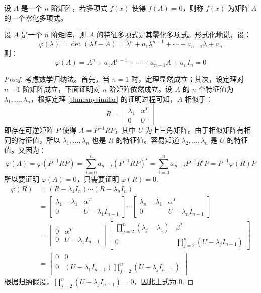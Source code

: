 \begin{definition}[零化多项式]
设 $A$ 是一个 $n$ 阶矩阵，若多项式 $f(x)$ 使得 $f(A)=0$，则称 $f(x)$ 为矩阵 $A$ 的一个零化多项式。
\end{definition}

\begin{theorem}
\label{thm:Hamilton-Cayley}
设 $A$ 是一个 $n$ 阶矩阵，则 $A$ 的特征多项式是其零化多项式。形式化地说，设：
\[
\varphi(\lambda)=\det(\lambda I-A)=\lambda^n+a_1\lambda^{n-1}+\cdots+a_{n-1}\lambda+a_n
\]
则：
\[
\varphi(A)=A^n+a_1A^{n-1}+\cdots+a_{n-1}A+a_nI_n=0
\]
\end{theorem}

\begin{proof}
考虑数学归纳法。首先，当 $n=1$ 时，定理显然成立；其次，设定理对 $n-1$ 阶矩阵成立，下面证明对 $n$ 阶矩阵依然成立。设 $A$ 的 $n$ 个特征值为 $\lambda_1,\ldots,\lambda_n$，根据定理 \ref{thm:anysimilar} 的证明过程可知，$A$ 相似于：
\[R=\begin{bmatrix}\lambda_1&\alpha^T\\0&U\end{bmatrix}\]
即存在可逆矩阵 $P$ 使得 $A=P^{-1}RP$，其中 $U$ 为上三角矩阵。由于相似矩阵有相同的特征值，所以 $\lambda_1,\ldots,\lambda_n$ 也是 $R$ 的特征值。容易知道 $\lambda_2,\ldots,\lambda_n$ 是 $U$ 的特征值。又因为：
\[
\varphi(A)=\varphi(P^{-1}RP)=\sum_{i=0}^n a_{n-i}(P^{-1}RP)^i=\sum_{i=0}^n a_{n-i}P^{-1}R^iP=P^{-1}\varphi(R)P
\]
所以要证明 $\varphi(A)=0$，只需要证明 $\varphi(R)=0$.
\begin{align*}
\varphi(R)&=(R-\lambda_1I_n)\cdots(R-\lambda_n I_n)\\
&=\begin{bmatrix}\lambda_1-\lambda_1&\alpha^T\\0&U-\lambda_1I_{n-1}\end{bmatrix}\cdots\begin{bmatrix}\lambda_n-\lambda_1&\alpha^T\\0&U-\lambda_nI_{n-1}\end{bmatrix}\\
&=\begin{bmatrix}0&\alpha^T\\0&U-\lambda_1I_{n-1}\end{bmatrix}\begin{bmatrix}\prod_{j=2}^n(\lambda_j-\lambda_1)&\beta^T\\0&\prod_{j=2}^n(U-\lambda_jI_{n-1})\end{bmatrix}\\
&=\begin{bmatrix}0&0\\0&(U-\lambda_1 I_{n-1})\prod_{j=2}^n(U-\lambda_jI_{n-1})\end{bmatrix}
\end{align*}
根据归纳假设，$\prod_{j=2}^n(U-\lambda_jI_{n-1})=0$，因此上式为 $0$.
\end{proof}

